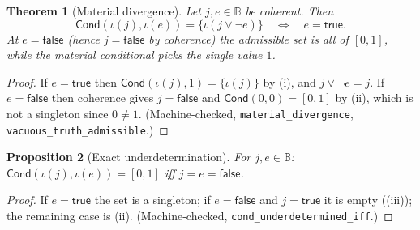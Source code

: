 \documentclass[11pt,a4paper]{article}
\newtheorem{theorem}{Theorem}[section]
\newtheorem{proposition}[theorem]{Proposition}
\newcommand{\Cond}{\mathsf{Cond}}
\newcommand{\Bool}{\mathbb{B}}
\begin{document}
\begin{theorem}[Material divergence]
\label{thm:material-divergence}
Let $j, e \in \Bool$ be coherent.
Then
\[
  \Cond(\iota(j), \iota(e)) = \{\iota(j \vee \lnot e)\}
  \quad\Longleftrightarrow\quad e = \mathsf{true}.
\]
At $e = \mathsf{false}$ (hence $j = \mathsf{false}$ by coherence) the
admissible set is all of $[0,1]$, while the material conditional picks
the single value $1$.
\end{theorem}
\begin{proof}
If $e = \mathsf{true}$ then $\Cond(\iota(j), 1) = \{\iota(j)\}$ by
(i), and
$j \vee \lnot e = j$.
If $e = \mathsf{false}$ then coherence gives $j = \mathsf{false}$ and
$\Cond(0,0) = [0,1]$ by (ii), which is not a
singleton since $0 \neq 1$.
(Machine-checked, \texttt{material\_divergence},
\texttt{vacuous\_truth\_admissible}.)
\end{proof}

\begin{proposition}[Exact underdetermination]
\label{prop:underdet}
For $j, e \in \Bool$:
$\Cond(\iota(j), \iota(e)) = [0,1]$ iff
$j = e = \mathsf{false}$.
\end{proposition}
\begin{proof}
If $e = \mathsf{true}$ the set is a singleton; if $e = \mathsf{false}$
and $j = \mathsf{true}$ it is empty
((iii)); the remaining case is
(ii).
(Machine-checked, \texttt{cond\_underdetermined\_iff}.)
\end{proof}
\end{document}
